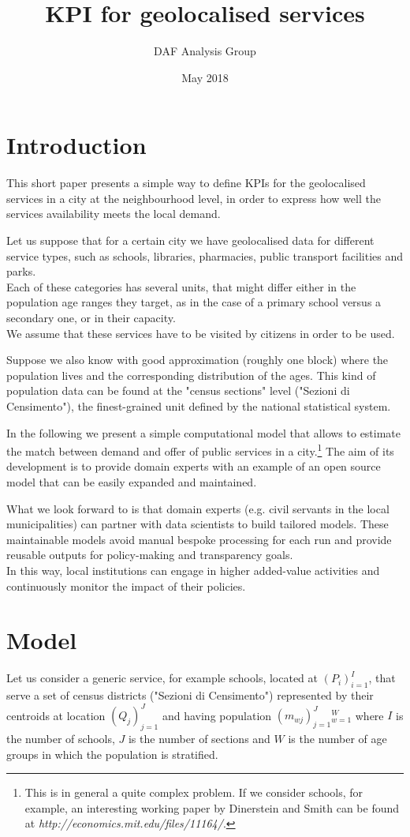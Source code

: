 \documentclass{article}
\title{KPI for geolocalised services}
\author{DAF Analysis Group}
\date{May 2018}
\begin{document}
\maketitle
\section{Introduction}
This short paper presents a simple way to define KPIs for the geolocalised services in a city at the neighbourhood level, in order to express how well the services availability meets the local demand.

Let us suppose that for a certain city we have geolocalised data for different service types, such as schools, libraries, pharmacies, public transport facilities and parks.\\
Each of these categories has several units, that might differ either in the population age ranges they target, as in the case of a primary school versus a secondary one, or in their capacity. \\
We assume that these services have to be visited by citizens in order to be used. 

Suppose we also know with good approximation (roughly one block) where the population lives and the corresponding distribution of the ages. This kind of population data can be found at the "census sections" level ("Sezioni di Censimento"), the finest-grained unit defined by the national statistical system.

In the following we present a simple computational model that allows to estimate the match between demand and offer of public services in a city.\footnote{This is in general a quite complex problem. If we consider schools, for example, an interesting working paper by Dinerstein and Smith can be found at \textit{http://economics.mit.edu/files/11164/}.}
The aim of its development is to provide domain experts with an example of an open source model that can be easily expanded and maintained.

What we look forward to is that domain experts (e.g. civil servants in the local municipalities) can partner with data scientists to build tailored models. These maintainable models avoid manual bespoke processing for each run and provide reusable outputs for policy-making and transparency goals. \\
In this way, local institutions can engage in higher added-value activities and continuously monitor the impact of their policies.

\newpage
\section{Model}
Let us consider a generic service, for example schools, located at $(P_i)_{i=1}^I$, that serve a set of census districts ("Sezioni di Censimento") represented by their centroids at location $(Q_j)_{j=1}^{J}$ and having population $(m_{wj})_{j=1}^{J}{}_{w=1}^{W}$ where $I$ is the  number of schools, $J$ is the number of sections and $W$ is the number of age groups in which the population is stratified.
\end{document}
